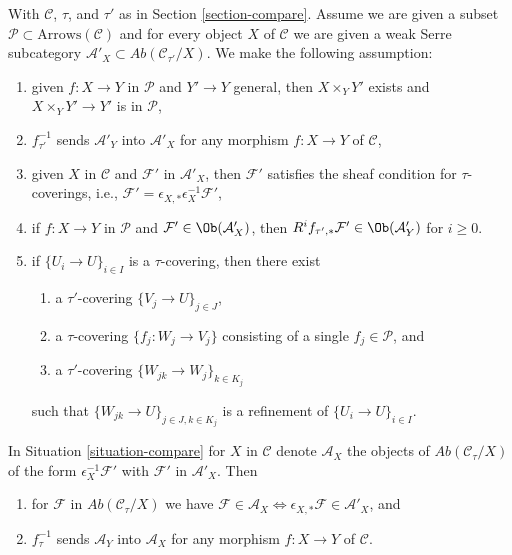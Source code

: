 \begin{situation}
\label{situation-compare}
With $\mathcal{C}$, $\tau$, and $\tau'$ as in Section \ref{section-compare}.
Assume we are given a subset $\mathcal{P} \subset \text{Arrows}(\mathcal{C})$
and for every object $X$ of $\mathcal{C}$ we are given a weak Serre subcategory
$\mathcal{A}'_X \subset \textit{Ab}(\mathcal{C}_{\tau'}/X)$.
We make the following assumption:
\begin{enumerate}
\item
\label{item-base-change-P}
given $f : X \to Y$ in $\mathcal{P}$ and $Y' \to Y$ general,
then $X \times_Y Y'$ exists and $X \times_Y Y' \to Y'$ is in $\mathcal{P}$,
\item
\label{item-restriction-A}
$f_{\tau'}^{-1}$ sends $\mathcal{A}'_Y$ into $\mathcal{A}'_X$
for any morphism $f : X \to Y$ of $\mathcal{C}$,
\item
\label{item-A-sheaf}
given $X$ in $\mathcal{C}$ and $\mathcal{F}'$ in $\mathcal{A}'_X$, then
$\mathcal{F}'$ satisfies the sheaf condition for $\tau$-coverings, i.e.,
$\mathcal{F}' = \epsilon_{X, *}\epsilon_X^{-1}\mathcal{F}'$,
\item
\label{item-A-and-P}
if $f : X \to Y$ in $\mathcal{P}$ and
$\mathcal{F}' \in \Ob(\mathcal{A}'_X)$, then
$R^if_{\tau', *}\mathcal{F}' \in \Ob(\mathcal{A}'_Y)$
for $i \geq 0$.
\item
\label{item-refine-tau-by-P}
if $\{U_i \to U\}_{i \in I}$ is a $\tau$-covering, then there exist
\begin{enumerate}
\item a $\tau'$-covering $\{V_j \to U\}_{j \in J}$,
\item a $\tau$-covering $\{f_j : W_j \to V_j\}$ consisting
of a single $f_j \in \mathcal{P}$, and
\item a $\tau'$-covering $\{W_{jk} \to W_j\}_{k \in K_j}$
\end{enumerate}
such that $\{W_{jk} \to U\}_{j \in J, k \in K_j}$ is a refinement of
$\{U_i \to U\}_{i \in I}$.
\end{enumerate}
\end{situation}

\begin{lemma}
\label{lemma-A}
In Situation \ref{situation-compare} for $X$ in $\mathcal{C}$
denote $\mathcal{A}_X$
the objects of $\textit{Ab}(\mathcal{C}_\tau/X)$ of the form
$\epsilon_X^{-1}\mathcal{F}'$ with $\mathcal{F}'$ in $\mathcal{A}'_X$.
Then
\begin{enumerate}
\item for $\mathcal{F}$ in $\textit{Ab}(\mathcal{C}_\tau/X)$
we have $\mathcal{F} \in \mathcal{A}_X \Leftrightarrow
\epsilon_{X, *}\mathcal{F} \in \mathcal{A}'_X$, and
\item $f_\tau^{-1}$ sends $\mathcal{A}_Y$ into $\mathcal{A}_X$
for any morphism $f : X \to Y$ of $\mathcal{C}$.
\end{enumerate}
\end{lemma}

